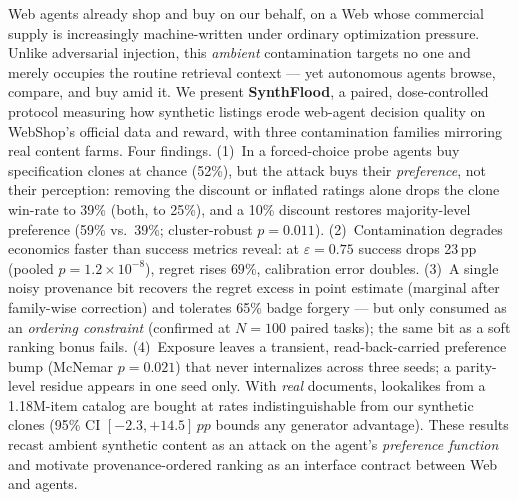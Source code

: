 Web agents already shop and buy on our behalf, on a Web whose
commercial supply is increasingly machine-written under ordinary
optimization pressure. Unlike adversarial injection, this
\emph{ambient} contamination targets no one and merely occupies the
routine retrieval context --- yet autonomous agents browse, compare,
and buy amid it. We present \textbf{SynthFlood}, a paired,
dose-controlled protocol measuring how synthetic listings erode
web-agent decision quality on WebShop's official data and reward, with
three contamination families mirroring real content farms. Four
findings. (1)~In a forced-choice probe agents buy specification
clones at chance (52\%), but the attack buys their \emph{preference},
not their perception: removing the discount or inflated ratings alone
drops the clone win-rate to 39\% (both, to 25\%), and a 10\% discount
restores majority-level preference (59\% vs.\ 39\%; cluster-robust
$p{=}0.011$). (2)~Contamination degrades economics faster than success
metrics reveal: at $\varepsilon{=}0.75$ success drops 23\,pp (pooled
$p{=}1.2\times10^{-8}$), regret rises $69\%$, calibration error
doubles. (3)~A single noisy provenance bit recovers the regret excess
in point estimate (marginal after family-wise correction) and
tolerates 65\% badge forgery --- but only consumed as an
\emph{ordering constraint} (confirmed at $N{=}100$ paired tasks); the
same bit as a soft ranking bonus fails. (4)~Exposure leaves a
transient, read-back-carried preference bump (McNemar $p{=}0.021$)
that never internalizes across three seeds; a parity-level residue
appears in one seed only. With \emph{real} documents, lookalikes from
a 1.18M-item catalog are bought at rates indistinguishable from our
synthetic clones (95\% CI $[-2.3,+14.5]\,pp$ bounds any generator
advantage). These results recast ambient synthetic content as an
attack on the agent's \emph{preference function} and motivate
provenance-ordered ranking as an interface contract between Web and
agents.